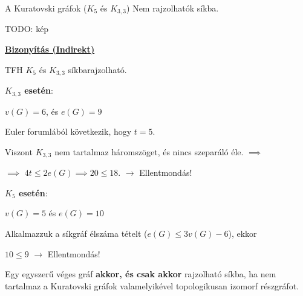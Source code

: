 \documentclass[10pt]{article}
\renewcommand{\\}{\par\noindent}
\begin{document}
\begin{frame}
\begin{tcolorbox}[title={Tétel: Kuratovski gráfok}]
A Kuratovski gráfok ($K_5$ és $K_{3,3}$) Nem rajzolhatók síkba.\\
TODO: kép\\
\tcblower
\smallskip
\underline{\textbf{Bizonyítás (Indirekt)}}\\
\medskip
TFH $K_5$ és $K_{3,3}$ síkbarajzolható.\\
\smallskip
\textbf{$K_{3,3}$ esetén}:\\
$v(G) = 6$, és $e(G) = 9$\\
Euler forumlából következik, hogy $t = 5$.\\
Viszont $K_{3,3}$ nem tartalmaz háromszöget, és nincs szeparáló éle. $\implies$\\
$\implies$ $4t \leq 2e(G) \implies 20 \leq 18$. $\rightarrow$ Ellentmondás!\\
\smallskip
\textbf{$K_5$ esetén}:\\
$v(G) = 5$ és $e(G) = 10$\\
Alkalmazzuk a síkgráf élszáma tételt ($e(G) \leq 3v(G) - 6$), ekkor\\
$10 \leq 9$ $\rightarrow$ Ellentmondás!

\end{tcolorbox}

\end{frame}

\begin{frame}
\begin{tcolorbox}[title={Tétel: Kuratovski tétel}]
Egy egyszerű véges gráf \textbf{akkor, és csak akkor} rajzolható síkba, ha nem tartalmaz a Kuratovski gráfok valamelyikével topologikusan izomorf részgráfot.

\end{tcolorbox}

\end{frame}
\end{document}
